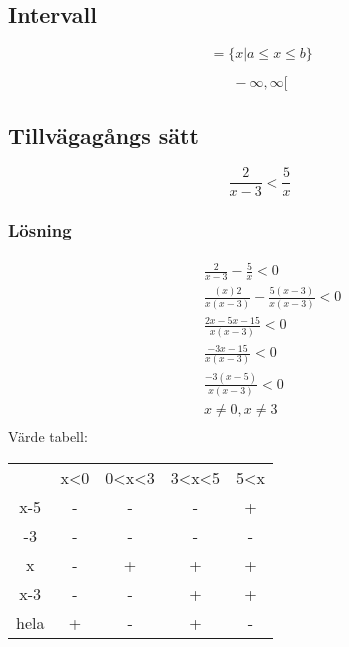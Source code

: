 \subsection{Intervall}
\begin{equation}
[ \, a, b ] \, = \{ x | a \leq x \leq b \}
\end{equation}

\begin{equation}
[ \, a, \infty [ \,
\end{equation}
\begin{equation}
] \, -\infty, \infty [ \,
\end{equation}

\subsection{Tillvägagångs sätt}
\begin{equation}
\frac { 2 } { x - 3 } < \frac { 5 } { x }
\end{equation}


\subsubsection{Lösning}
\begin{align*}
&\quad \frac{ 2 }{ x - 3 } - \frac{ 5 }{ x } < 0 \\
&\quad \frac{(x) 2 }{x (x - 3)} - \frac{ 5 ( x - 3 )}{ x ( x - 3 ) } < 0 \\
&\quad \frac{ 2 x - 5 x - 15 }{ x ( x - 3 ) } < 0 \\
&\quad \frac{ - 3 x - 15 }{ x ( x - 3 ) } < 0 \\
&\quad \frac{ - 3 ( x - 5 ) }{ x ( x - 3 ) } < 0 \\
&\quad  x \neq 0 , x \neq 3 \\
\end{align*}
Värde tabell:
\begin{center}
\begin{tabular}{ |c|c|c|c|c| } 
 \hline
        & x<0   & 0<x<3 & 3<x<5 & 5<x   \\ 
 x-5    & -     & -     & -     & +     \\ 
 -3     & -     & -     & -     & -     \\  
 x      & -     & +     & +     & +     \\ 
 x-3    & -     & -     & +     & +     \\ 
 hela   & +     & -     & +     & -     \\ 
 \hline
\end{tabular}
\end{center}



